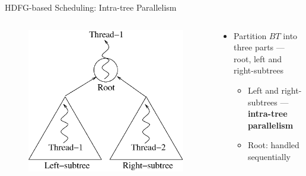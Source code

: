 \documentclass[handout]{beamer}
\begin{document}
\begin{CJK}{UTF8}{bkai}
            \begin{frame}{HDFG-based Scheduling: Intra-tree Parallelism}
                \begin{columns}
                    \begin{column}{0.45\textwidth}
                        \begin{figure}[!ht] 
                            \centering
                            \includegraphics[width=1.0\textwidth]{./figs/partition}
                            \label{fig:archi}
                        \end{figure}
                    \end{column}
                    \begin{column}{0.6\textwidth}
                        \begin{itemize}
                            \pause
                            \item {Partition $BT$ into three parts --- root, left and right-subtrees
                                \begin{itemize}
                                    \item Left and right-subtrees --- \textbf{intra-tree parallelism}
                                    \item Root: handled sequentially
                                \end{itemize}
                            }
                        \pause

\end{itemize}
\end{column}
\end{columns}
\end{frame}
\end{CJK}
\end{document}
